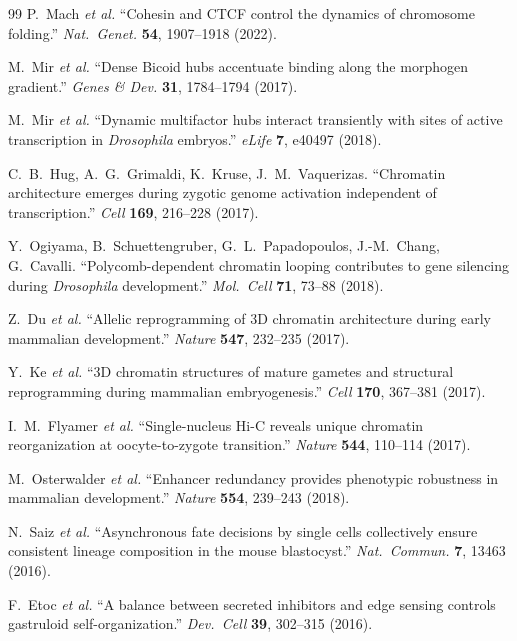 \documentclass[11pt]{article}
\begin{document}
\begin{thebibliography}{99}
P.~Mach \textit{et al.} ``Cohesin and CTCF control the dynamics of
chromosome folding.'' \textit{Nat.\ Genet.} \textbf{54}, 1907--1918 (2022).

M.~Mir \textit{et al.} ``Dense Bicoid hubs accentuate binding along the
morphogen gradient.'' \textit{Genes \& Dev.} \textbf{31}, 1784--1794 (2017).

M.~Mir \textit{et al.} ``Dynamic multifactor hubs interact transiently with
sites of active transcription in \textit{Drosophila} embryos.''
\textit{eLife} \textbf{7}, e40497 (2018).

C.~B.~Hug, A.~G.~Grimaldi, K.~Kruse, J.~M.~Vaquerizas. ``Chromatin
architecture emerges during zygotic genome activation independent of
transcription.'' \textit{Cell} \textbf{169}, 216--228 (2017).

Y.~Ogiyama, B.~Schuettengruber, G.~L.~Papadopoulos, J.-M.~Chang,
G.~Cavalli. ``Polycomb-dependent chromatin looping contributes to gene
silencing during \textit{Drosophila} development.''
\textit{Mol.\ Cell} \textbf{71}, 73--88 (2018).

Z.~Du \textit{et al.} ``Allelic reprogramming of 3D chromatin architecture
during early mammalian development.'' \textit{Nature} \textbf{547},
232--235 (2017).

Y.~Ke \textit{et al.} ``3D chromatin structures of mature gametes and
structural reprogramming during mammalian embryogenesis.''
\textit{Cell} \textbf{170}, 367--381 (2017).

I.~M.~Flyamer \textit{et al.} ``Single-nucleus Hi-C reveals unique chromatin
reorganization at oocyte-to-zygote transition.''
\textit{Nature} \textbf{544}, 110--114 (2017).

M.~Osterwalder \textit{et al.} ``Enhancer redundancy provides phenotypic
robustness in mammalian development.''
\textit{Nature} \textbf{554}, 239--243 (2018).

N.~Saiz \textit{et al.} ``Asynchronous fate decisions by single cells
collectively ensure consistent lineage composition in the mouse blastocyst.''
\textit{Nat.\ Commun.} \textbf{7}, 13463 (2016).

F.~Etoc \textit{et al.} ``A balance between secreted inhibitors and edge
sensing controls gastruloid self-organization.''
\textit{Dev.\ Cell} \textbf{39}, 302--315 (2016).


\end{thebibliography}
\end{document}
